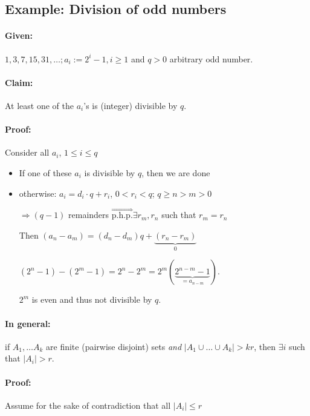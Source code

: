 \documentclass[11pt]{article}
\begin{document}
\subsection{Example: Division of odd numbers}

\paragraph{Given:} $ 1, 3, 7, 15, 31, \dots; a_i := 2^i - 1, i \geq 1 $ and $ q > 0 $ arbitrary odd number.

\paragraph{Claim:} At least one of the $ a_i $'s is (integer) divisible by $ q $.

\paragraph{Proof:} Consider all $ a_i $, $ 1 \leq i \leq q $
\begin{itemize}
\item If one of these $ a_i $ is divisible by $ q $, then we are done
\item otherwise: $ a_i = d_i \cdot q + r_i $, $ 0 < r_i < q $; $ q \geq n > m > 0 $

	$ \Rightarrow (q - 1) $ remainders $ \overset{\Rightarrow}{\text{p.h.p.}} \exists r_m, r_n $ such that $ r_m = r_n $
	
	Then $ (a_n - a_m) = (d_n - d_m) q + \underbrace{(r_n - r_m)}_{0} $
	
	$ (2^n - 1) - (2^m - 1) = 2^n - 2^m = 2^m(\underbrace{2^{n - m} - 1}_{= a_{n - m}}) $.
	
	$ 2^m $ is even and thus not divisible by $ q $.
\end{itemize}

\paragraph{In general:} if $ A_1, \dots A_k $ are finite (pairwise disjoint) sets \textit{and} $ | A_1 \cup \dots \cup A_k | > kr $, then $ \exists i $ such that $ | A_i | > r $.

\paragraph{Proof:} Assume for the sake of contradiction that all $ | A_i | \leq r $
\end{document}

